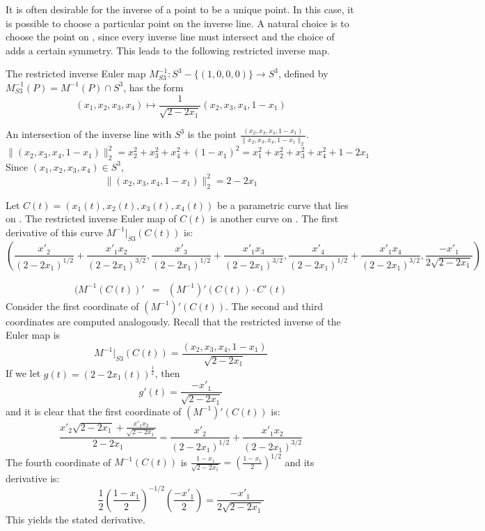 \documentclass[12pt]{article}
\begin{document}
It is often desirable for the inverse of a point to be a unique point.
In this case, it is possible to choose a particular point on the inverse line.
A natural choice is to choose the point on , since every inverse line must intersect
 and the choice of  adds a certain symmetry.
This leads to the following restricted inverse map.

\begin{lemma}
The restricted inverse Euler map $M^{-1}_{S3}: S^3 - \{(1,0,0,0)\} \rightarrow S^3$,
defined by $M^{-1}_{S3}(P) = M^{-1}(P) \cap S^3$, has the form
\begin{equation}
(x_1,x_2,x_3,x_4) \mapsto \frac{1}{\sqrt{2-2x_1}}(x_2,x_3,x_4,1-x_1)
\end{equation}
\end{lemma}
\prf
An intersection of the inverse line with $S^3$
is the point $\frac{(x_2,x_3,x_4,1-x_1)}{\|x_2,x_3,x_4,1-x_1\|_2}$.
\[
\|(x_2,x_3,x_4,1-x_1)\|_2^2 = x_2^2 + x_3^2 + x_4^2 + (1-x_1)^2
= x_1^2 + x_2^2 + x_3^2 + x_4^2 + 1 - 2x_1
\]
Since $(x_1,x_2,x_3,x_4) \in S^3$,
\[
\|(x_2,x_3,x_4,1-x_1)\|_2^2 = 2 - 2x_1
\]
\QED


\begin{lemma}
Let $C(t) = (x_1(t),x_2(t),x_3(t),x_4(t))$ be a parametric curve that lies on .
The restricted inverse Euler map of $C(t)$ is another curve on .
The first derivative of this curve $M^{-1}|_{S3}(C(t))$ is:
\[
(\frac{x'_2}{(2-2x_1)^{1/2}} + \frac{x'_1x_2}{(2-2x_1)^{3/2}}, 
 \frac{x'_3}{(2-2x_1)^{1/2}} + \frac{x'_1x_3}{(2-2x_1)^{3/2}},
 \frac{x'_4}{(2-2x_1)^{1/2}} + \frac{x'_1x_4}{(2-2x_1)^{3/2}},
 \frac{-x'_1}{2\sqrt{2-2x_1}})
\]
\end{lemma}
\prf
\begin{eqnarray*}
(M^{-1}(C(t))' & = & (M^{-1})'(C(t)) \cdot C'(t)
\end{eqnarray*}
Consider the first coordinate of $(M^{-1})'(C(t))$.
The second and third coordinates are computed analogously.
Recall that the restricted inverse of the Euler map is
\[
M^{-1}|_{S3}(C(t)) = \frac{(x_2,x_3,x_4,1-x_1)}{\sqrt{2-2x_1}}
\]
If we let $g(t) = (2-2x_1(t))^{\frac{1}{2}}$, then
\[
g'(t) = \frac{-x'_1}{\sqrt{2-2x_1}}
\]
and it is clear that the first coordinate of $(M^{-1})'(C(t))$ is:
\[
\frac{x'_2 \sqrt{2-2x_1} + \frac{x'_1 x_2}{\sqrt{2-2x_1}}}{2-2x_1}
= \frac{x'_2}{(2-2x_1)^{1/2}} + \frac{x'_1x_2}{(2-2x_1)^{3/2}}
\]
The fourth coordinate of $M^{-1}(C(t))$ is 
$\frac{1-x_1}{\sqrt{2-2x_1}} = (\frac{1-x_1}{2})^{1/2}$
and its derivative is:
\[
\frac{1}{2} (\frac{1-x_1}{2})^{-1/2}(\frac{-x'_1}{2})
= \frac{-x'_1}{2\sqrt{2-2x_1}}
\]
This yields the stated derivative.
\QED
\end{document}
